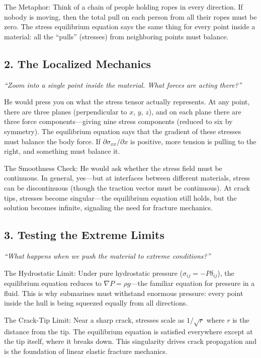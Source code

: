 The Metaphor: Think of a chain of people holding ropes in every direction. If nobody is moving, then the total pull on each person from all their ropes must be zero. The stress equilibrium equation says the same thing for every point inside a material: all the ``pulls'' (stresses) from neighboring points must balance.

\subsection*{2. The Localized Mechanics}
\textit{``Zoom into a single point inside the material. What forces are acting there?''}

He would press you on what the stress tensor actually represents. At any point, there are three planes (perpendicular to $x$, $y$, $z$), and on each plane there are three force components---giving nine stress components (reduced to six by symmetry). The equilibrium equation says that the gradient of these stresses must balance the body force. If $\partial \sigma_{xx}/\partial x$ is positive, more tension is pulling to the right, and something must balance it.

The Smoothness Check: He would ask whether the stress field must be continuous. In general, yes---but at interfaces between different materials, stress can be discontinuous (though the traction vector must be continuous). At crack tips, stresses become singular---the equilibrium equation still holds, but the solution becomes infinite, signaling the need for fracture mechanics.

\subsection*{3. Testing the Extreme Limits}
\textit{``What happens when we push the material to extreme conditions?''}

The Hydrostatic Limit: Under pure hydrostatic pressure ($\sigma_{ij} = -P\delta_{ij}$), the equilibrium equation reduces to $\nabla P = \rho g$---the familiar equation for pressure in a fluid. This is why submarines must withstand enormous pressure: every point inside the hull is being squeezed equally from all directions.

The Crack-Tip Limit: Near a sharp crack, stresses scale as $1/\sqrt{r}$ where $r$ is the distance from the tip. The equilibrium equation is satisfied everywhere except at the tip itself, where it breaks down. This singularity drives crack propagation and is the foundation of linear elastic fracture mechanics.

